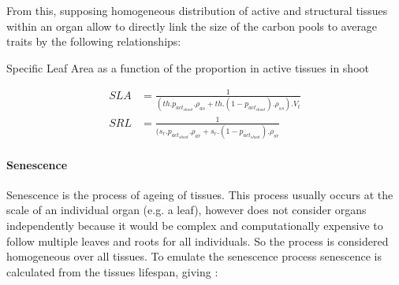 \indent From this, supposing homogeneous distribution of active and structural tissues within an organ allow to directly link the size of the carbon pools to average traits by the following relationships:
\begin{marginfigure}
\label{fig:SLA}
\caption{Specific Leaf Area as a function of the proportion in active tissues in shoot}
\end{marginfigure}

\begin{align}
  SLA &= \frac{1}{(th .  p_{act_{shoot}} . \rho_{as} + th . (1 -  p_{act_{shoot}}) . \rho_{ss} ) . V_{t}}\\
  SRL &= \frac{1}{(s_{r} .  p_{act_{shoot}} . \rho_{ar} + s_{r}.(1 -  p_{act_{shoot}}) . \rho_{sr}}
\end{align}


\paragraph{Senescence}

Senescence is the process of ageing of tissues. This process usually occurs at the scale of an individual organ (e.g. a leaf), however \model does not consider organs independently because it would be complex and computationally expensive to follow multiple leaves and roots for all individuals. So the process is considered homogeneous over all tissues. To emulate the senescence process senescence is calculated from the tissues lifespan, giving :

